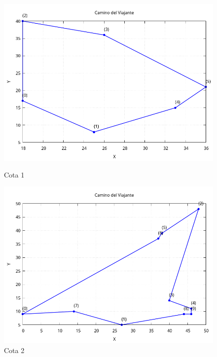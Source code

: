 \documentclass[11pt,openany]{book}
\begin{document}
\begin{figure}[H]
      \centering
      \begin{minipage}{.48\textwidth}
            \centering
            \includegraphics[width=1\linewidth]{assets/Img/Cota_3_BB/grafico_6_1_cota3.png}
            \caption{Cota 1}
            \label{fig:Nodos}
      \end{minipage}%
      \centering
      \begin{minipage}{.48\textwidth}
            \centering
            \includegraphics[width=1\linewidth]{assets/Img/Cota_3_BB/grafico_10_1_cota3.png}
            \caption{Cota 2}
            \label{fig:Nodos}
      \end{minipage}
      \begin{minipage}{.48\textwidth}

\end{minipage}
\end{figure}
\end{document}
